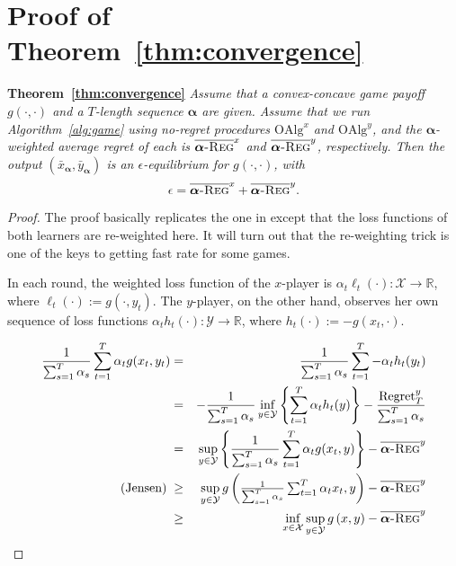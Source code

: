 \documentclass[pmlr]{jmlr} %
\def\reals{\mathbb{R}}
\def\reals{\mathbb{R}}
\def\balpha{\boldsymbol{\alpha}}
\def\alg{\text{OAlg}}
\newcommand{\avgregret}[1]{\overline{\balpha\textsc{-Reg}}^{#1}}
\newcommand{\XX}{\mathcal{X}}
\newcommand{\YY}{\mathcal{Y}}
\begin{document}
\section{Proof of Theorem~\ref{thm:convergence}} \label{app:thm:convergence}

\textbf{Theorem~\ref{thm:convergence}} 
\textit{
  Assume that a convex-concave game payoff $g(\cdot, \cdot)$ and a $T$-length sequence $\balpha$ are given. Assume that we run Algorithm~\ref{alg:game} using no-regret procedures $\alg^{x}$ and $\alg^{y}$, and the $\balpha$-weighted average regret of each is $\avgregret{x}$ and $\avgregret{y}$, respectively. Then the output  $(\bar{x}_{\balpha},\bar{y}_{\balpha})$ is an $\epsilon$-equilibrium for $g(\cdot, \cdot)$, with
  \[
    \epsilon = \avgregret{x} + \avgregret{y}.
  \] 
\]} 

\begin{proof}
The proof basically replicates the one in \cite{AW17} 
except that the loss functions of both learners are re-weighted here.
It will turn out that the re-weighting trick is one of the keys to getting fast rate for some games.

In each round, the weighted loss function of the $x$-player is $\alpha_{t} \ell_{t}(\cdot) : \XX \to \reals$, where $\ell_{t}(\cdot) := g(\cdot, y_{t})$. The $y$-player, on the other hand, observes her own sequence of loss functions $\alpha_{t}  h_{t}(\cdot) : \YY \to \reals$, where $h_{t}(\cdot) := -  g(x_{t}, \cdot)$.


\begin{eqnarray}
\frac{1}{\sum_{s=1}^{T} \alpha_{s}}   \sum_{t=1}^{T} \alpha_{t} g(x_{t}, y_{t}) 
  & = & \frac{1}{\sum_{s=1}^{T} \alpha_{s}} \sum_{t=1}^{T}  - \alpha_{t}  h_{t}(y_{t})  \notag \\
  \text{} \; & = & 
    - \frac{1}{\sum_{s=1}^{T} \alpha_{s}} \inf_{y \in \YY} \left\{ \sum_{t=1}^{T}  \alpha_{t}  h_{t}(y) \right\} - \frac{ \text{Regret}_{T}^{y} }{  \sum_{s=1}^{T} \alpha_{s} } \notag \\
  \; & = &
    \sup_{y \in \YY} \left\{ \frac{1}{\sum_{s=1}^{T} \alpha_{s}} \sum_{t=1}^{T}  \alpha_{t} g( x_{t} , y ) \right\} - \avgregret{y}  \notag \\
  \text{(Jensen)} \;  & \geq & 
    \sup_{y \in \YY} g\left({\textstyle \frac{1}{\sum_{s=1}^{T} \alpha_{s}} \sum_{t=1}^{T}  \alpha_{t} x_{t} }, y \right)  - \avgregret{y} 
     \label{eq:ylowbound}  \\
  & \geq & \inf_{x \in \XX} \sup_{y \in \YY} g\left( x , y \right) - \avgregret{y}  \notag
\end{eqnarray}


\end{proof}
\end{document}
